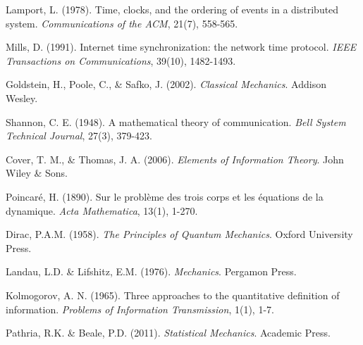 \documentclass[12pt,a4paper]{article}
\begin{document}
\begin{thebibliography}{99}

Lamport, L. (1978). Time, clocks, and the ordering of events in a distributed system. \textit{Communications of the ACM}, 21(7), 558-565.

Mills, D. (1991). Internet time synchronization: the network time protocol. \textit{IEEE Transactions on Communications}, 39(10), 1482-1493.

Goldstein, H., Poole, C., \& Safko, J. (2002). \textit{Classical Mechanics}. Addison Wesley.

Shannon, C. E. (1948). A mathematical theory of communication. \textit{Bell System Technical Journal}, 27(3), 379-423.

Cover, T. M., \& Thomas, J. A. (2006). \textit{Elements of Information Theory}. John Wiley \& Sons.

Poincaré, H. (1890). Sur le problème des trois corps et les équations de la dynamique. \textit{Acta Mathematica}, 13(1), 1-270.

Dirac, P.A.M. (1958). \textit{The Principles of Quantum Mechanics}. Oxford University Press.

Landau, L.D. \& Lifshitz, E.M. (1976). \textit{Mechanics}. Pergamon Press.

Kolmogorov, A. N. (1965). Three approaches to the quantitative definition of information. \textit{Problems of Information Transmission}, 1(1), 1-7.

Pathria, R.K. \& Beale, P.D. (2011). \textit{Statistical Mechanics}. Academic Press.

\end{thebibliography}
\end{document}
